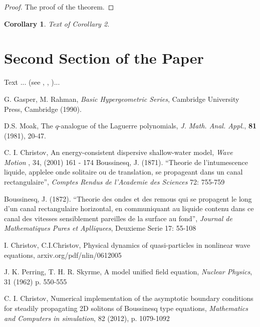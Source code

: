 \documentclass[12pt]{article}
\theoremstyle{theorem}
\newtheorem{corollary}[theorem]{Corollary}
\theoremstyle{defi}
\begin{document}
\begin{proof}
The proof of the theorem.
\end{proof}

\begin{corollary}
Text of Corollary 2.
\end{corollary}

\section{Second Section of the Paper}

Text ... (see \cite{gasrah}, \cite{rosbl}, \cite{Moak})...

\begin{thebibliography}{99}

 G. Gasper, M. Rahman,
{\it Basic Hypergeometric Series}, Cambridge University Press, Cambridge (1990).

 D.S. Moak,
The $q$-analogue of the Laguerre polynomials, {\it J. Math. Anal. Appl.}, {\bf 81} (1981), 20-47.

 C. I. Christov, An energy-consistent dispersive shallow-water model,  {\it Wave Motion }, 34, (2001) 161 - 174
 Boussinesq, J. (1871). “Theorie de l’intumescence liquide, applelee onde solitaire ou de translation, se propageant dans un canal rectangulaire”,  {\it Comptes Rendus de l’Academie des Sciences } 72: 755-759

 Boussinesq, J. (1872). “Theorie des ondes et des remous qui se propagent le long d’un canal rectangulaire horizontal, en communiquant au liquide contenu dans ce canal des vitesses sensiblement pareilles de la surface au fond”, {\it Journal de Mathematiques Pures et Aplliquees}, Deuxieme Serie 17: 55-108

 I. Christov, C.I.Christov, Physical dynamics of quasi-particles in nonlinear wave equations, arxiv.org/pdf/nlin/0612005

 J. K. Perring, T. H. R. Skyrme, A model unified field equation, {\it Nuclear Physics},  31 (1962) p. 550-555 

  C. I. Christov, Numerical implementation of the asymptotic boundary conditions for steadily propagating 2D solitons of Boussinesq type equations, {\it Mathematics and Computers in simulation}, 82 (2012), p. 1079-1092


\end{thebibliography}
\end{document}
